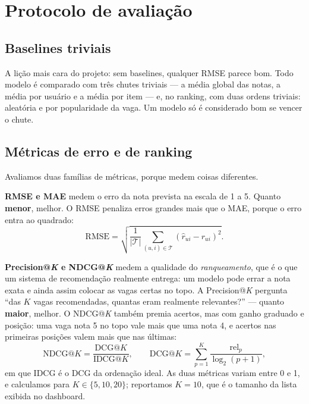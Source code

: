 \documentclass[12pt,a4paper]{article}
\begin{document}
\section{Protocolo de avaliação}\label{sec:avaliacao}

\subsection{Baselines triviais}

A lição mais cara do projeto: sem baselines, qualquer RMSE parece bom. Todo modelo é comparado com três chutes triviais --- a média global das notas, a média por usuário e a média por item --- e, no ranking, com duas ordens triviais: aleatória e por popularidade da vaga. Um modelo só é considerado bom se vencer o chute.

\subsection{Métricas de erro e de ranking}

Avaliamos duas famílias de métricas, porque medem coisas diferentes.

\textbf{RMSE e MAE} medem o erro da nota prevista na escala de 1 a 5. Quanto \textbf{menor}, melhor. O RMSE penaliza erros grandes mais que o MAE, porque o erro entra ao quadrado:
\begin{equation}
\text{RMSE} = \sqrt{\frac{1}{|\mathcal{T}|} \sum_{(u,i) \in \mathcal{T}} \left(\hat{r}_{ui} - r_{ui}\right)^2}.
\end{equation}

\textbf{Precision@\textit{K} e NDCG@\textit{K}} medem a qualidade do \textit{ranqueamento}, que é o que um sistema de recomendação realmente entrega: um modelo pode errar a nota exata e ainda assim colocar as vagas certas no topo. A Precision@\textit{K} pergunta ``das $K$ vagas recomendadas, quantas eram realmente relevantes?'' --- quanto \textbf{maior}, melhor. O NDCG@\textit{K} \cite{ndcg} também premia acertos, mas com ganho graduado e posição: uma vaga nota 5 no topo vale mais que uma nota 4, e acertos nas primeiras posições valem mais que nas últimas:
\begin{equation}
\text{NDCG@}K = \frac{\text{DCG@}K}{\text{IDCG@}K}, \qquad \text{DCG@}K = \sum_{p=1}^{K} \frac{\text{rel}_p}{\log_2(p+1)},
\end{equation}
em que IDCG é o DCG da ordenação ideal. As duas métricas variam entre 0 e 1, e calculamos para $K \in \{5, 10, 20\}$; reportamos $K = 10$, que é o tamanho da lista exibida no dashboard.
\end{document}
